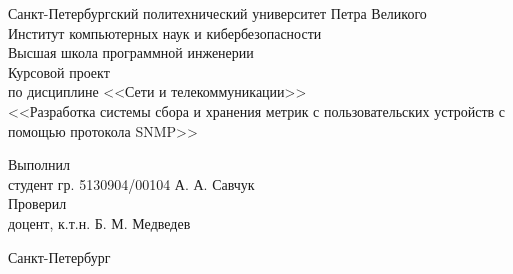 \begin{titlepage}

	\begin{center}
	  Санкт-Петербургский политехнический университет Петра Великого\\
	  Институт компьютерных наук и кибербезопасности\\
	  Высшая школа программной инженерии\\[8cm]

	  {\LARGE Курсовой проект}\\[0.5cm]
	  \noindent по дисциплине <<Сети и телекоммуникации>>\\
	  \noindent <<Разработка системы сбора и хранения метрик с пользовательских устройств с помощью протокола SNMP>>
	  \\[5cm]
	\end{center}

	  \noindent Выполнил\\
	  \noindent студент гр. 5130904/00104 \hfill А. А. Савчук\\

	  \noindent Проверил \\
	  \noindent доцент, к.т.н. \hfill Б. М. Медведев

	\vfill

	\begin{center}
	  Санкт-Петербург\\
	  \the\year
	\end{center}

\end{titlepage}
